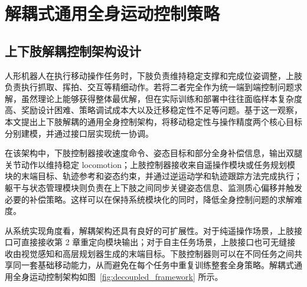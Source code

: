 
\chapter{解耦式通用全身运动控制策略}

\section{上下肢解耦控制架构设计}

人形机器人在执行移动操作任务时，下肢负责维持稳定支撑和完成位姿调整，上肢负责执行抓取、挥拍、交互等精细动作。若将二者完全作为统一端到端控制问题求解，虽然理论上能够获得整体最优解，但在实际训练和部署中往往面临样本复杂度高、奖励设计困难、策略调试成本大以及迁移稳定性不足等问题。基于这一观察，本文提出上下肢解耦的通用全身控制架构，将移动稳定性与操作精度两个核心目标分别建模，并通过接口层实现统一协调。

在该架构中，下肢控制器接收速度命令、姿态目标和部分全身补偿信息，输出双腿关节动作以维持稳定 locomotion；上肢控制器接收来自遥操作模块或任务规划模块的末端目标、轨迹参考和姿态约束，并通过逆运动学和轨迹跟踪方法完成执行；躯干与状态管理模块则负责在上下肢之间同步关键姿态信息、监测质心偏移并触发必要的补偿策略。这样可以在保持系统模块化的同时，降低全身控制问题的求解难度。

从系统实现角度看，解耦架构还具有良好的可扩展性。对于纯遥操作场景，上肢接口可直接接收第 2 章重定向模块输出；对于自主任务场景，上肢接口也可无缝接收由视觉感知和高层规划器生成的末端目标。下肢控制器则可以在不同任务之间共享同一套基础移动能力，从而避免在每个任务中重复训练整套全身策略。解耦式通用全身运动控制架构如图~\ref{fig:decoupled_framework} 所示。

